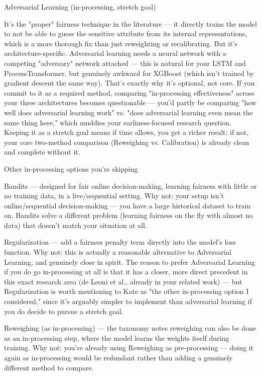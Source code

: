 \documentclass[authoryear,preprint,12pt]{elsarticle}
\begin{document}
Adversarial Learning (in-processing, stretch goal)

It's the "proper" fairness technique in the literature — it directly trains the model to not be able to guess the sensitive attribute from its internal representations, which is a more thorough fix than just reweighting or recalibrating.
But it's architecture-specific. Adversarial learning needs a neural network with a competing "adversary" network attached — this is natural for your LSTM and ProcessTransformer, but genuinely awkward for XGBoost (which isn't trained by gradient descent the same way).
That's exactly why it's optional, not core. If you commit to it as a required method, comparing "in-processing effectiveness" across your three architectures becomes questionable — you'd partly be comparing "how well does adversarial learning work" vs. "does adversarial learning even mean the same thing here," which muddies your earliness-focused research question. Keeping it as a stretch goal means if time allows, you get a richer result; if not, your core two-method comparison (Reweighing vs. Calibration) is already clean and complete without it.

Other in-processing options you're skipping

Bandits — designed for fair online decision-making, learning fairness with little or no training data, in a live/sequential setting.
Why not: your setup isn't online/sequential decision-making — you have a large historical dataset to train on. Bandits solve a different problem (learning fairness on the fly with almost no data) that doesn't match your situation at all.

Regularization — add a fairness penalty term directly into the model's loss function.
Why not: this is actually a reasonable alternative to Adversarial Learning, and genuinely close in spirit. The reason to prefer Adversarial Learning if you do go in-processing at all is that it has a closer, more direct precedent in this exact research area (de Leoni et al., already in your related work) — but Regularization is worth mentioning to Kate as "the other in-processing option I considered," since it's arguably simpler to implement than adversarial learning if you do decide to pursue a stretch goal.

Reweighing (as in-processing) — the taxonomy notes reweighing can also be done as an in-processing step, where the model learns the weights itself during training.
Why not: you're already using Reweighing as pre-processing — doing it again as in-processing would be redundant rather than adding a genuinely different method to compare.
\end{document}
